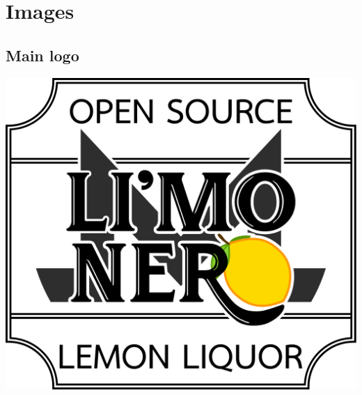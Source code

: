\documentclass[12pt,a4paper]{article}
\begin{document}
\section{Images}

\subsection{Main logo}

\begin{center}
\includegraphics[width=1\textwidth]{img/logo.pdf}
\end{center}
\end{document}
